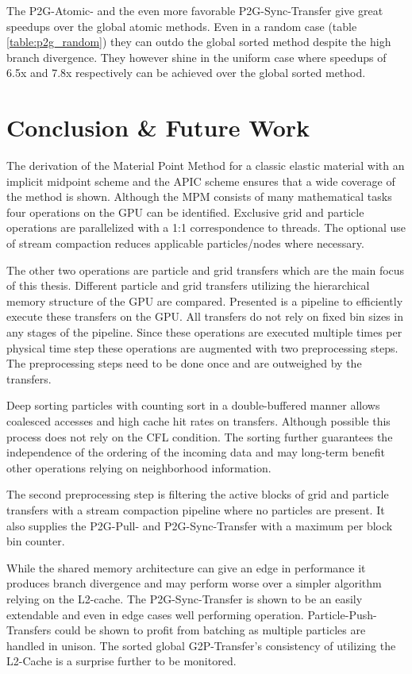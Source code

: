 \documentclass[m,times]{cgMA}
\begin{document}
The P2G-Atomic- and the even more favorable P2G-Sync-Transfer give great speedups over the global atomic methods. Even in a random case (table \ref{table:p2g_random}) they can outdo the global sorted method despite the high branch divergence. They however shine in the uniform case where speedups of 6.5x and 7.8x respectively can be achieved over the global sorted method.
\clearpage
\section{Conclusion \& Future Work}\label{sec:conclusion}
The derivation of the Material Point Method for a classic elastic material with an implicit midpoint scheme and the APIC scheme ensures that a wide coverage of the method is shown. Although the MPM consists of many mathematical tasks four operations on the GPU can be identified. Exclusive grid and particle operations are parallelized with a 1:1 correspondence to threads. The optional use of stream compaction reduces applicable particles/nodes where necessary.

The other two operations are particle and grid transfers which are the main focus of this thesis. Different particle and grid transfers utilizing the hierarchical memory structure of the GPU are compared. Presented is a pipeline to efficiently execute these transfers on the GPU. All transfers do not rely on fixed bin sizes in any stages of the pipeline. Since these operations are executed multiple times per physical time step these operations are augmented with two preprocessing steps. The preprocessing steps need to be done once and are outweighed by the transfers.

Deep sorting particles with counting sort in a double-buffered manner allows coalesced accesses and high cache hit rates on transfers. Although possible this process does not rely on the CFL condition. The sorting further guarantees the independence of the ordering of the incoming data and may long-term benefit other operations relying on neighborhood information.

The second preprocessing step is filtering the active blocks of grid and particle transfers with a stream compaction pipeline where no particles are present. It also supplies the P2G-Pull- and P2G-Sync-Transfer with a maximum per block bin counter.

While the shared memory architecture can give an edge in performance it produces branch divergence and may perform worse over a simpler algorithm relying on the L2-cache. The P2G-Sync-Transfer is shown to be an easily extendable and even in edge cases well performing operation. Particle-Push-Transfers could be shown to profit from batching as multiple particles are handled in unison. The sorted global G2P-Transfer's consistency of utilizing the L2-Cache is a surprise further to be monitored.
\end{document}
